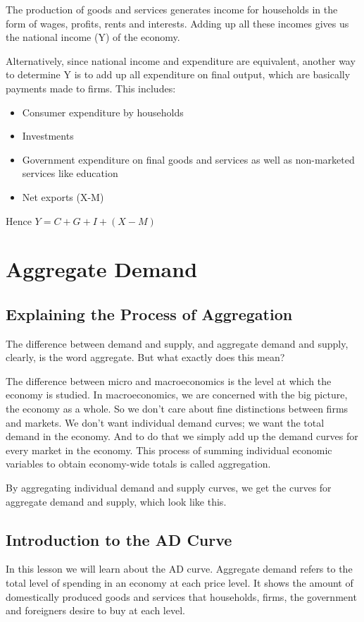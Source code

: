 The production of goods and services generates income for households in the form of wages, profits, rents and interests. Adding up all these incomes gives us the national income (Y) of the economy.

Alternatively, since national income and expenditure are equivalent, another way to determine Y is to add up all expenditure on final output, which are basically payments made to firms. This includes:
\begin{itemize}
\item Consumer expenditure by households
\item Investments 
\item Government expenditure on final goods and services as well as non-marketed services like education
\item Net exports (X-M)
\end{itemize}
Hence $Y = C + G + I + (X-M)$ 
\section{Aggregate Demand}
\subsection{Explaining the Process of Aggregation}
The difference between demand and supply, and aggregate demand and supply, clearly, is the word aggregate. But what exactly does this mean?

The difference between micro and macroeconomics is the level at which the economy is studied. In macroeconomics, we are concerned with the big picture, the economy as a whole. So we don’t care about fine distinctions between firms and markets. We don’t want individual demand curves; we want the total demand in the economy. And to do that we simply add up the demand curves for every market in the economy. This process of summing individual economic variables to obtain economy-wide totals is called aggregation. 

By aggregating individual demand and supply curves, we get the curves for aggregate demand and supply, which look like this. 
\subsection{Introduction to the AD Curve}
In this lesson we will learn about the AD curve. Aggregate demand refers to the total level of spending in an economy at each price level. It shows the amount of domestically produced goods and services that households, firms, the government and foreigners desire to buy at each level. 

